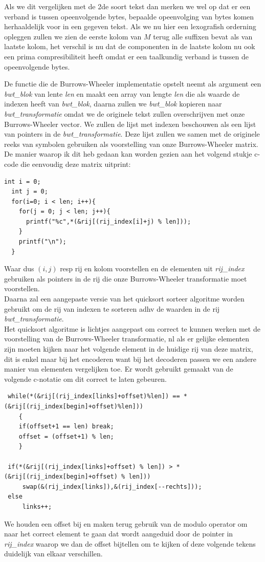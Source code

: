 \documentclass[10pt,a4paper]{report}
\begin{document}
Als we dit vergelijken met de 2de soort tekst dan merken we wel op dat er een verband is tussen opeenvolgende bytes, bepaalde opeenvolging van bytes komen herhaaldelijk voor in een gegeven tekst. Als we nu hier een lexografish orderning opleggen zullen we zien de eerste kolom van $M$ terug alle suffixen bevat als van laatste kolom, het verschil is nu dat de componenten in de laatste kolom nu ook een prima compresibiliteit heeft omdat er een taalkundig verband is tussen de opeenvolgende bytes.


De functie die de Burrows-Wheeler implementatie opstelt neemt als argument een \emph{bwt\_blok} van lente \emph{len} en maakt een array van lengte \emph{len} die als waarde de indexen heeft van \emph{bwt\_blok}, daarna zullen we \emph{bwt\_blok} kopieren naar \emph{bwt\_transformatie} omdat we de originele tekst zullen overschrijven met onze Burrows-Wheeler vector. We zullen de lijst met indexen beschouwen als een lijst van pointers in de \emph{bwt\_transformatie}. Deze lijst zullen we samen met de originele reeks van symbolen gebruiken als voorstelling van onze Burrows-Wheeler matrix. De manier waarop ik dit heb gedaan kan worden gezien aan het volgend stukje c-code die eenvoudig deze matrix uitprint:

\begin{lstlisting}
int i = 0;
  int j = 0;
  for(i=0; i < len; i++){
    for(j = 0; j < len; j++){
      printf("%c",*(&rij[(rij_index[i]+j) % len]));
    }
    printf("\n");
  }
\end{lstlisting}
Waar dus $(i,j)$ resp rij en kolom voorstellen en de elementen uit \emph{rij\_index} gebruiken als pointers in de rij die onze Burrows-Wheeler transformatie moet voorstellen. \\

Daarna zal een aangepaste versie van het quicksort sorteer algoritme worden gebruikt om de rij van indexen te sorteren adhv de waarden in de rij \emph{bwt\_transformatie}.\\

Het quicksort algoritme is lichtjes aangepast om correct te kunnen werken met de voorstelling van de Burrows-Wheeler transformatie, nl als er gelijke elementen zijn moeten kijken naar het volgende element in de huidige rij van deze matrix, dit is enkel maar bij het encoderen want bij het decoderen passen we een andere manier van elementen vergelijken toe. Er wordt gebruikt gemaakt van de volgende c-notatie om dit correct te laten gebeuren. 
\begin{lstlisting}
 while(*(&rij[(rij_index[links]+offset)%len]) == *(&rij[(rij_index[begin]+offset)%len]))
    {
    if(offset+1 == len) break;  
    offset = (offset+1) % len;
    }
	 
 if(*(&rij[(rij_index[links]+offset) % len]) > *(&rij[(rij_index[begin]+offset) % len]))
	 swap(&(rij_index[links]),&(rij_index[--rechts]));
 else
	 links++;	 
\end{lstlisting}
We houden een offset bij en maken terug gebruik van de modulo operator om naar het correct element te gaan dat wordt aangeduid door de pointer in \emph{rij\_index} waarop we dan de offset bijtellen om te kijken of deze volgende tekens duidelijk van elkaar verschillen.\\
\end{document}
